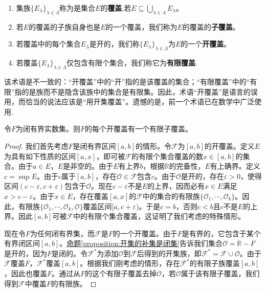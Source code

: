 \documentclass[lang=cn,newtx,10pt,scheme=chinese]{../Template/elegantbook}
\begin{document}
\begin{definition}[覆盖]\label{definition:覆盖}
\begin{enumerate}
  \item 集族\(\{E_{\lambda}\}_{\lambda\in\Lambda}\)称为是集合\(E\)的\textbf{覆盖},若\(E\subseteq\bigcup_{\lambda\in\Lambda}E_{\lambda}\)。
  
  \item 若\(E\)的覆盖的子族自身也是\(E\)的一个覆盖，我们称为\(E\)的覆盖的\textbf{子覆盖}。
  
  \item 若覆盖中的每个集合\(E_{\lambda}\)是开的，我们称\(\{E_{\lambda}\}_{\lambda\in\Lambda}\)为\(E\)的一个\textbf{开覆盖}。
  
  \item 若覆盖\(\{E_{\lambda}\}_{\lambda\in\Lambda}\)仅包含有限个集合，我们称它为\textbf{有限覆盖}.
\end{enumerate} 
\end{definition}
\begin{note}
  该术语是不一致的：“开覆盖”中的“开”指的是该覆盖的集合；“有限覆盖”中的“有限”指的是族而不是隐含该族中的集合是有限集。因此，术语“开覆盖”是语言的误用，而恰当的说法应该是“用开集覆盖”。遗憾的是，前一个术语已在数学中广泛使用.
\end{note}

\begin{theorem}\label{theorem:Heine - Borel定理}
  令\(F\)为闭有界实数集。则\(F\)的每个开覆盖有一个有限子覆盖。
\end{theorem}
\begin{proof}
  我们首先考虑\(F\)是闭有界区间\([a, b]\)的情形。令\(\mathcal{F}\)为\([a, b]\)的开覆盖。定义\(E\)为具有如下性质的区间\([a, x]\)，即可被\(\mathcal{F}\)的有限个集合覆盖的数\(x\in[a, b]\)的集合。由于\(a\in E\)，\(E\)是非空的。由于\(E\)有上界\(b\)，根据\(\mathbb{R}\)的完备性，\(E\)有上确界。定义\(c = \sup E\)。由于\(c\)属于\([a, b]\)，存在\(\mathcal{O}\in\mathcal{F}\)包含\(c\)。由于\(\mathcal{O}\)是开的，存在\(\varepsilon>0\)，使得区间\((c - \varepsilon, c+\varepsilon)\)包含于\(\mathcal{O}\)。现在\(c - \varepsilon\)不是\(E\)的上界，因而必有\(x\in E\)满足\(x>c - \varepsilon\)。由于\(x\in E\)，存在覆盖\([a, x]\)的\(\mathcal{F}\)中的集合的有限族\(\{\mathcal{O}_1, \cdots, \mathcal{O}_k\}\)。因此，有限族\(\{\mathcal{O}_1, \cdots, \mathcal{O}_k, \mathcal{O}\}\)覆盖区间\([a, c+\varepsilon)\)。于是\(c = b\)，否则\(c < b\)且\(c\)不是\(E\)的上界。因此\([a, b]\)可被\(\mathcal{F}\)中的有限个集合覆盖，这证明了我们考虑的特殊情形。

现在令\(F\)为任何闭有界集，而\(\mathcal{F}\)是\(F\)的一个开覆盖。由于\(F\)是有界的，它包含于某个有界闭区间\([a, b]\)。\hyperref[proposition:开集的补集是闭集]{命题\ref{proposition:开集的补集是闭集}}告诉我们集合\(\mathcal{O}=\mathbb{R}- F\)是开的，因为\(F\)是闭的。令\(\mathcal{F}^*\)为添加\(\mathcal{O}\)到\(\mathcal{F}\)后得到的开集族，即\(\mathcal{F}^*=\mathcal{F}\cup\mathcal{O}\)。由于\(\mathcal{F}\)覆盖\(F\)，\(\mathcal{F}^*\)覆盖\([a, b]\)。根据我们刚考虑的情形，存在\(\mathcal{F}^*\)的有限子族覆盖\([a, b]\)，因此也覆盖\(F\)。通过从\(F\)的这个有限子覆盖去掉\(\mathcal{O}\)，若\(\mathcal{O}\)属于该有限子覆盖，我们得到\(\mathcal{F}\)中覆盖\(F\)的有限族。
\end{proof}
\end{document}
